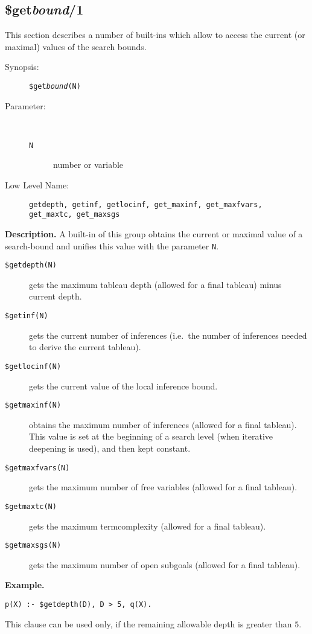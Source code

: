 %
%
%
\subsection{\$get{\em bound\/}/1}

This section describes a number of built-ins which allow to access the
current (or maximal) values of the search bounds.
\begin{description}
\item[Synopsis:]
	{\tt \$get{\em bound}(N)}
\item[Parameter:]\ \\[-0.5cm]
	\begin{description}
	\item[{\tt N}] number or variable
	\end{description}
\item[Low Level Name:]
	{\tt getdepth, getinf, getlocinf, get\_maxinf, get\_maxfvars,
             get\_maxtc, get\_maxsgs} 
\end{description}

\vspace*{0.5cm}
\noindent
{\bf Description.}
A built-in of this group obtains the current or maximal value
of a search-bound and
unifies this value with the parameter {\tt N}.
\begin{description}
\item[{\tt \$getdepth(N)}]
            gets the maximum tableau depth
            (allowed for a final tableau) minus current depth.
\item[{\tt \$getinf(N)}]
            gets the current number
            of inferences (i.e.\ the number of inferences needed
            to derive the current tableau).
\item[{\tt \$getlocinf(N)}]
            gets the current value 
            of the local inference bound.
\item[{\tt \$getmaxinf(N)}]
            obtains the maximum number
            of inferences (allowed for a final tableau).
            This value is set at the beginning of a search level (when
            iterative deepening is used), and then kept constant.
\item[{\tt \$getmaxfvars(N)}]
            gets the maximum number
            of free variables (allowed for a final tableau).
\item[{\tt \$getmaxtc(N)}]
            gets the maximum termcomplexity
            (allowed for a final tableau).
\item[{\tt \$getmaxsgs(N)}]
            gets the maximum number
            of open subgoals (allowed for a final tableau).
\end{description}

\vspace*{0.5cm}
\noindent
{\bf Example.}
\begin{verbatim}
p(X) :- $getdepth(D), D > 5, q(X).
\end{verbatim}

This clause can be used only, if the remaining allowable depth
is greater than $5$.


